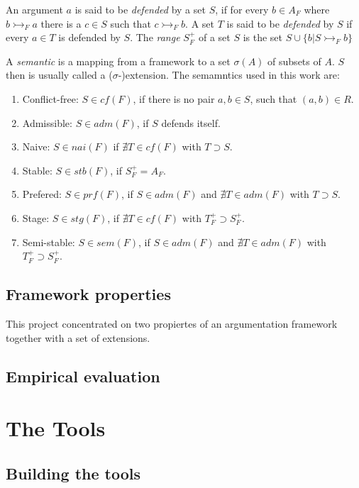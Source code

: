 \documentclass{scrartcl}
\begin{document}
 An argument $a$ is said to be
\emph{defended} by a set $S$, if for every $b \in A_F$ where $b \rightarrowtail_F a$
there is a $c \in S$ such that $c \rightarrowtail_F b$. A set $T$ is said to be \emph{defended}
by $S$ if every $a \in T$ is defended by $S$. The \emph{range} $S_F^{+}$ of a
set $S$ is the set $S \cup\{b | S \rightarrowtail_F b\}$

A \emph{semantic} is a mapping from a framework to a set $\sigma(A)$ of subsets of $A$.
$S$ then is usually called a ($\sigma$-)extension. The semamntics used in this
work are:
\begin{enumerate}
  \item Conflict-free: $S \in cf(F)$, if there is no pair $a,b \in S$, such that $(a,b) \in R$.
  \item Admissible: $S \in adm(F)$, if $S$ defends itself.
  \item Naive: $S \in nai(F)$ if $\nexists T\in cf(F)$ with $T \supset S$.
  \item Stable: $S \in stb(F)$, if $S_F^{+} = A_F$.
  \item Prefered: $S \in prf(F)$, if $S \in adm(F)$ and $\nexists T\in adm(F)$ with $T \supset S$.
  \item Stage: $S \in stg(F)$, if $\nexists T\in cf(F)$ with $T_F^{+} \supset S_F^{+}$.
  \item Semi-stable: $S \in sem(F)$, if $S \in adm(F)$ and $\nexists T\in adm(F)$ with
          $T_F^{+} \supset S_F^{+}$.
\end{enumerate}

\subsection{Framework properties}

This project concentrated on two propiertes of an argumentation framework
together with a set of extensions.


\subsection{Empirical evaluation}

\section{The Tools}
\label{tools}
\subsection{Building the tools}
\end{document}
